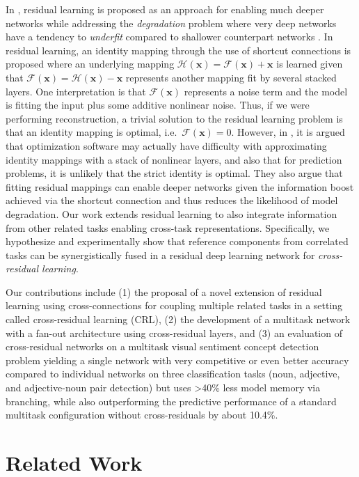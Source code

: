 \documentclass{sig-alternate-05-2015}
\newcommand{\mb}{\mathbf}
\begin{document}
In \cite{he_2016}, residual learning is proposed as an approach for enabling much deeper networks while addressing the \emph{degradation} problem where very deep networks have a tendency to \emph{underfit} compared to shallower counterpart networks \cite{srivastava_2015}.
In residual learning, an identity mapping through the use of shortcut connections \cite{raiko_2012} is proposed where an underlying mapping $\mathcal{H}(\mb x) = \mathcal{F}(\mb x) + \mb x$ is learned given that $\mathcal{F}(\mb x) = \mathcal{H}(\mb x) - \mb x$ represents another mapping fit by several stacked layers.
One interpretation is that $\mathcal{F}(\mb x)$ represents a noise term and the model is fitting the input plus some additive nonlinear noise.
Thus, if we were performing reconstruction, a trivial solution to the residual learning problem is that an identity mapping is optimal, i.e.~$\mathcal{F}(\mb x) = 0$.
However, in \cite{he_2016}, it is argued that optimization software may actually have difficulty with approximating identity mappings with a stack of nonlinear layers, and also that for prediction problems, it is unlikely that the strict identity is optimal.
They also argue that fitting residual mappings can enable deeper networks given the information boost achieved via the shortcut connection and thus reduces the likelihood of model degradation.
Our work extends residual learning \cite{he_2016} to also integrate information from other related tasks enabling cross-task representations.
Specifically, we hypothesize and experimentally show that reference components from correlated tasks can be synergistically fused in a residual deep learning network for \emph{cross-residual learning}.

Our contributions include
(1) the proposal of a novel extension of residual learning \cite{he_2016} using cross-connections for coupling multiple related tasks in a setting called cross-residual learning (CRL),
(2) the development of a multitask network with a fan-out architecture using cross-residual layers, and
(3) an evaluation of cross-residual networks on a multitask visual sentiment concept detection problem yielding a single network with very competitive or even better accuracy compared to individual networks on three classification tasks (noun, adjective, and adjective-noun pair detection) but uses >40\% less model memory via branching, while also outperforming the predictive performance of a standard multitask configuration without cross-residuals by about 10.4\%.

\section{Related Work}
\label{sec:relatedwork}
\end{document}
